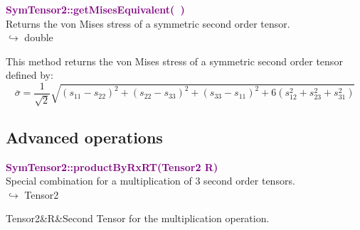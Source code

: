 \textcolor{purple}{\textbf{SymTensor2::getMisesEquivalent(~)}}\label{SymTensor2::getMisesEquivalent()}\\
Returns the von Mises stress of a symmetric second order tensor.\\ \hspace*{10mm}$\hookrightarrow$ double

This method returns the von Mises stress of a symmetric second order tensor defined by:
\begin{equation*}
\overline{\sigma} = \frac {1}{\sqrt{2}}\sqrt{(s_{11}-s_{22})^2+(s_{22}-s_{33})^2+(s_{33}-s_{11})^2+6(s_{12}^2+s_{23}^2+s_{31}^2)}
\end{equation*}

\subsection{Advanced operations}

\textcolor{purple}{\textbf{SymTensor2::productByRxRT(Tensor2 R)}}\label{SymTensor2::productByRxRT(Tensor2 R)}\\
Special combination for a multiplication of 3 second order tensors.\\ \hspace*{10mm}$\hookrightarrow$ Tensor2

\begin{tcolorbox}[width=\textwidth,myArgs,tabularx={ll|R},title=Arguments of SymTensor2::productByRxRT]
Tensor2&R&Second Tensor for the multiplication operation.
\end{tcolorbox}

